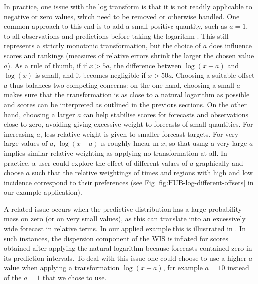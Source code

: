 \documentclass[10pt,letterpaper]{article}
\begin{document}
In practice, one issue with the log transform is that it is not readily applicable to negative or zero values, which need to be removed or otherwise handled. 
One common approach to this end is to add a small positive quantity, such as $a = 1$, to all observations and predictions before taking the logarithm \cite{bellegoDealingLogsZeros2022}. This still represents a strictly monotonic transformation, but the choice of $a$ does influence scores and rankings (measures of relative errors shrink the larger the chosen value $a$). As a rule of thumb, if if $x > 5a$, the difference between $\log{(x + a)}$ and $\log{(x)}$ is small, and it becomes negligible if $x > 50a$. Choosing a suitable offset $a$ thus balances two competing concerns: on the one hand, choosing a small $a$ makes sure that the transformation is as close to a natural logarithm as possible and scores can be interpreted as outlined in the previous sections. On the other hand, choosing a larger $a$ can help stabilise scores for forecasts and observations close to zero, avoiding giving excessive weight to forecasts of small quantities. For increasing $a$, less relative weight is given to smaller forecast targets. For very large values of $a$, $\log(x + a)$ is roughly linear in $x$, so that using a very large $a$ implies similar relative weighting as applying no transformation at all. In practice, a user could explore the effect of different values of $a$ graphically and choose $a$ such that the relative weightings of times and regions with high and low incidence correspond to their preferences (see Fig \ref{fig:HUB-log-different-offsets} in our example application).


A related issue occurs when the predictive distribution has a large probability mass on zero (or on very small values), as this can translate into an excessively wide forecast in relative terms. In our applied example this is illustrated in . In such instances, the dispersion component of the WIS is inflated for scores obtained after applying the natural logarithm because forecasts contained zero in its prediction intervals. To deal with this issue one could choose to use a higher $a$ value when applying a transformation $\log(x + a)$, for example $a = 10$ instead of the $a = 1$ that we chose to use.
\end{document}
